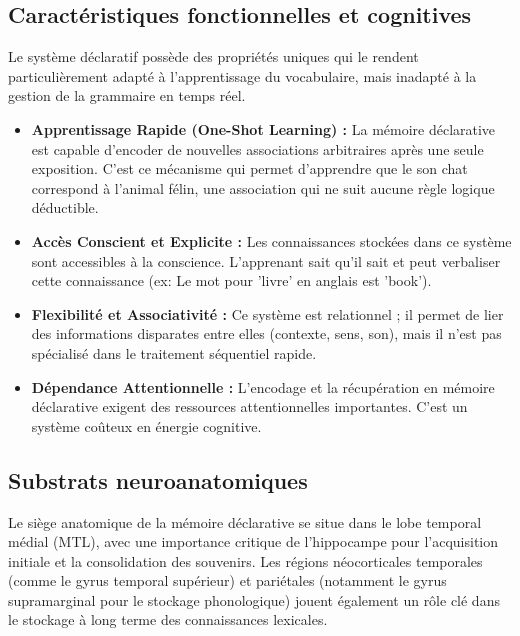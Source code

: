 \subsection{Caractéristiques fonctionnelles et cognitives}

Le système déclaratif possède des propriétés uniques qui le rendent particulièrement adapté à
l'apprentissage du vocabulaire, mais inadapté à la gestion de la grammaire en temps réel.

\begin{itemize}\item \textbf{Apprentissage Rapide (\og One-Shot Learning\fg{}) :} La mémoire déclarative est capable d'encoder de nouvelles associations arbitraires après une seule exposition. C'est ce mécanisme qui permet d'apprendre que le son \og chat\fg{} correspond à l'animal félin, une association qui ne suit aucune règle logique déductible.\cite{II-2-2-ref1}\item \textbf{Accès Conscient et Explicite :} Les connaissances stockées dans ce système sont accessibles à la conscience. L'apprenant \og sait qu'il sait\fg{} et peut verbaliser cette connaissance (ex: \og Le mot pour 'livre' en anglais est 'book'\fg{}).\item \textbf{Flexibilité et Associativité :} Ce système est relationnel ; il permet de lier des informations disparates entre elles (contexte, sens, son), mais il n'est pas spécialisé dans le traitement séquentiel rapide.\cite{II-2-2-ref2}\item \textbf{Dépendance Attentionnelle :} L'encodage et la récupération en mémoire déclarative exigent des ressources attentionnelles importantes. C'est un système coûteux en énergie cognitive.\end{itemize}

\subsection{Substrats neuroanatomiques}

Le siège anatomique de la mémoire déclarative se situe dans le lobe temporal médial (MTL), avec une
importance critique de l'hippocampe pour l'acquisition initiale et la consolidation des souvenirs.
Les régions néocorticales temporales (comme le gyrus temporal supérieur) et pariétales (notamment le
gyrus supramarginal pour le stockage phonologique) jouent également un rôle clé dans le stockage à
long terme des connaissances lexicales.\cite{II-2-2-ref2}



